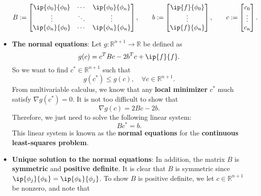 \documentclass{report}
\begin{document}
\begin{itemize}
$$                B := 
                \begin{bmatrix}
                    \ip{\phi_0}{\phi_0} & \cdots & \ip{\phi_0}{\phi_n} \\
                    \vdots & \ddots & \vdots\\
                    \ip{\phi_n}{\phi_0} & \cdots & \ip{\phi_n}{\phi_n} \\
                \end{bmatrix},
                \qquad
                b := 
                \begin{bmatrix}
                    \ip{f}{\phi_0}\\
                    \vdots\\
                    \ip{f}{\phi_n}\\
                \end{bmatrix},
                \qquad
                c := 
                \begin{bmatrix}
                    c_0 \\
                    \vdots\\
                    c_n \\
                \end{bmatrix}.
                $$
            \item \textbf{The normal equations}:
                Let $g \colon \mathbb{R}^{n+1} \to \mathbb{R}$ be defined as
                $$g(c) = c^T B c - 2b^Tc + \ip{f}{f}.$$
                So we want to find $c^* \in \mathbb{R}^{n+1}$ such that
                $$g(c^*) \leq g(c), \quad \forall c \in \mathbb{R}^{n+1}.$$
                From multivariable calculus, we know that any \textbf{local minimizer} $c^*$ much satisfy $\nabla g(c^*) = 0$.
                \bigbreak \noindent 
                It is not too difficult to show that 
                $$\nabla g(c) = 2Bc - 2b.$$
                Therefore, we just need to solve the following linear system:
                $$Bc^* = b.$$
                This linear system is known as the \textbf{normal equations} for the \textbf{continuous least-squares problem}.
                \bigbreak \noindent 
            \item \textbf{ Unique solution to the normal equations}:
                In addition, the matrix $B$ is \textbf{symmetric} and \textbf{positive definite}. 
                \bigbreak \noindent 
                It is clear that $B$ is symmetric since $\ip{\phi_j}{\phi_k} = \ip{\phi_k}{\phi_j}$.
                \bigbreak \noindent 
                To show $B$ is positive definite, we let $c \in \mathbb{R}^{n+1}$ be nonzero, and note that 

\end{itemize}
\end{document}
